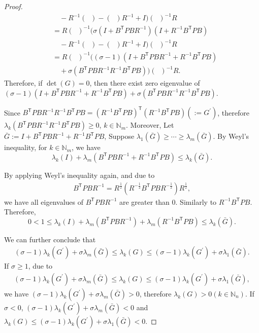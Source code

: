 \documentclass[letterpaper, 10 pt, conference]{ieeeconf}  %
\newcommand{\transpose}{\mathsf{T}}
\DeclareMathOperator{\tempRBP}{R + B^{\transpose}PB}
\begin{document}
\begin{proof}
\begin{align*}
        &\quad - R^{-1}(\tempRBP) - (\tempRBP)R^{-1} + I \bigg)(\tempRBP)^{-1}R\\
        &= R(\tempRBP)^{-1}\bigg(\sigma(I+B^{\transpose}PBR^{-1})(I+R^{-1}B^{\transpose}PB)\\
        &\quad  - R^{-1}(\tempRBP) - (\tempRBP)R^{-1} + I \bigg)(\tempRBP)^{-1}R\\
        &= R(\tempRBP)^{-1}\bigg((\sigma-1)(I+B^{\transpose}PBR^{-1}+R^{-1}B^{\transpose}PB)\\
        &\quad  + \sigma(B^{\transpose}PBR^{-1}R^{-1}B^{\transpose}PB)\bigg)(\tempRBP)^{-1}R.
    \end{align*}
    Therefore, if $\det(G) = 0$, then there exist zero eigenvalue of $(\sigma-1)(I+B^{\transpose}PBR^{-1}+R^{-1}B^{\transpose}PB) + \sigma(B^{\transpose}PBR^{-1}R^{-1}B^{\transpose}PB)$.

    Since $B^{\transpose}PBR^{-1}R^{-1}B^{\transpose}PB = (R^{-1}B^{\transpose}PB)^{\transpose}(R^{-1}B^{\transpose}PB)(:= G^{'})$, therefore
        $\lambda_{k}(B^{\transpose}PBR^{-1}R^{-1}B^{\transpose}PB) \geq 0$, $k\in  \mathbb{N}_m$.
    Moreover, Let $\bar{G} := I+B^{\transpose}PBR^{-1}+R^{-1}B^{\transpose}PB$, 
    Suppose $\lambda_{1}(\bar{G}) \geq \cdots \geq \lambda_{m}(\bar{G})$. By Weyl's inequality, for $ k \in \mathbb{N}_m$, we have
    \begin{equation}\label{eq:eigenStep3}
        \lambda_{k}(I) + \lambda_{m}(B^{\transpose}PBR^{-1}+R^{-1}B^{\transpose}PB) \leq \lambda_{k}(\bar{G}).
    \end{equation}
    
    By applying Weyl's inequality again, and due to 
    \begin{align*}
        B^{\transpose}PBR^{-1} = R^{\frac{1}{2}}(R^{-\frac{1}{2}}B^{\transpose}PBR^{-\frac{1}{2}})R^{\frac{1}{2}},
    \end{align*}
    we have all eigenvalues of $B^{\transpose}PBR^{-1}$ are greater than 0. Similarly to $R^{-1}B^{\transpose}PB$.
    Therefore,
    \begin{equation}\label{eq:eigenStep4}
        0 < 1 \leq \lambda_{k}(I) + \lambda_{m}(B^{\transpose}PBR^{-1})+\lambda_{m}(R^{-1}B^{\transpose}PB) \leq \lambda_{k}(\bar{G}).
    \end{equation}

     We can further conclude that
     \begin{align*}
         (\sigma-1)\lambda_{k}(G^{'})+\sigma\lambda_{m}(\bar{G}) \leq \lambda_{k}(G) \leq (\sigma-1)\lambda_{k}(G^{'})+\sigma\lambda_{1}(\bar{G}).
     \end{align*}
     If $\sigma \geq 1$, due to
     \begin{align*}
         (\sigma-1)\lambda_{k}(G^{'})+\sigma\lambda_{m}(\bar{G}) \leq \lambda_{k}(G) \leq (\sigma-1)\lambda_{k}(G^{'})+\sigma\lambda_{1}(\bar{G}),
     \end{align*}
     we have $(\sigma-1)\lambda_{k}(G^{'})+\sigma\lambda_{m}(\bar{G}) > 0$,
     therefore $\lambda_{k}(G) > 0(k \in \mathbb{N}_{n})$. If $\sigma < 0$, $(\sigma-1)\lambda_{k}(G^{'})+\sigma\lambda_{m}(\bar{G}) < 0$ and $\lambda_{k}(G) \leq (\sigma-1)\lambda_{k}(G^{'})+\sigma\lambda_{1}(\bar{G}) < 0$.
     

\end{proof}
\end{document}
